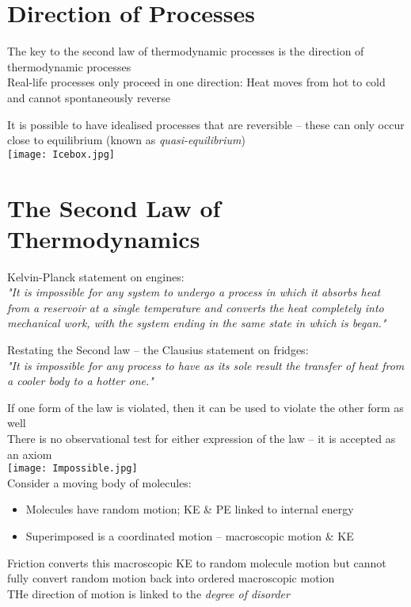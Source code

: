 \documentclass[a4paper, 11pt, fleqn, normalem]{report}
\begin{document}
\section{Direction of Processes}
The key to the second law of thermodynamic processes is the direction of thermodynamic processes \\
Real-life processes only proceed in one direction: Heat moves from hot to cold and cannot spontaneously reverse

It is possible to have idealised processes that are reversible -- these can only occur close to equilibrium (known as \emph{quasi-equilibrium}) \\
\texttt{[image: Icebox.jpg]}

\section{The Second Law of Thermodynamics}
Kelvin-Planck statement on engines: \\
\emph{"It is impossible for any system to undergo a process in which it absorbs heat from a reservoir at a single temperature and converts the heat completely into mechanical work, with the system ending in the same state in which is began."}

Restating the Second law -- the Clausius statement on fridges: \\
\emph{"It is impossible for any process to have as its sole result the transfer of heat from a cooler body to a hotter one."}

If one form of the law is violated, then it can be used to violate the other form as well \\
There is no observational test for either expression of the law -- it is accepted as an axiom \\
\texttt{[image: Impossible.jpg]} \\
Consider a moving body of molecules:
\begin{itemize}
	\item[] Molecules have random motion; KE \& PE linked to internal energy
	\item[] Superimposed is a coordinated motion -- macroscopic motion \& KE
\end{itemize}
Friction converts this macroscopic KE to random molecule motion but cannot fully convert random motion back into ordered macroscopic motion \\
THe direction of motion is linked to the \emph{degree of disorder}
\end{document}
